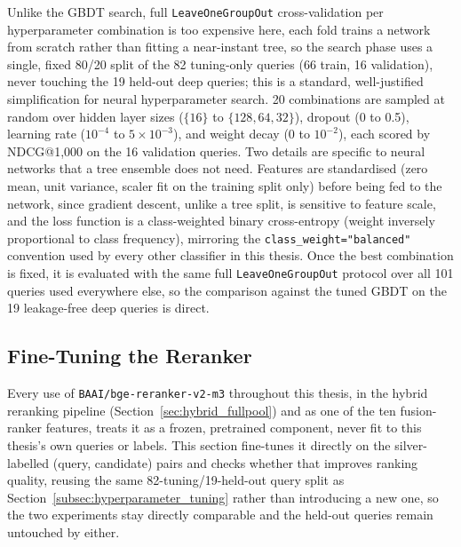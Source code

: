\documentclass[a4paper,oneside,bibliography=totoc]{scrbook}
\begin{document}
Unlike the GBDT search, full \texttt{LeaveOneGroupOut} cross-validation per hyperparameter combination is too expensive here, each fold trains a network from scratch rather than fitting a near-instant tree, so the search phase uses a single, fixed 80/20 split of the 82 tuning-only queries (66 train, 16 validation), never touching the 19 held-out deep queries; this is a standard, well-justified simplification for neural hyperparameter search. 20 combinations are sampled at random over hidden layer sizes ($\{16\}$ to $\{128,64,32\}$), dropout (0 to 0.5), learning rate ($10^{-4}$ to $5\times10^{-3}$), and weight decay (0 to $10^{-2}$), each scored by NDCG@1{,}000 on the 16 validation queries. Two details are specific to neural networks that a tree ensemble does not need. Features are standardised (zero mean, unit variance, scaler fit on the training split only) before being fed to the network, since gradient descent, unlike a tree split, is sensitive to feature scale, and the loss function is a class-weighted binary cross-entropy (weight inversely proportional to class frequency), mirroring the \texttt{class\_weight="balanced"} convention used by every other classifier in this thesis. Once the best combination is fixed, it is evaluated with the same full \texttt{LeaveOneGroupOut} protocol over all 101 queries used everywhere else, so the comparison against the tuned GBDT on the 19 leakage-free deep queries is direct.

\subsection{Fine-Tuning the Reranker}
\label{subsec:reranker_finetuning}

Every use of \texttt{BAAI/bge-reranker-v2-m3} throughout this thesis, in the hybrid reranking pipeline (Section~\ref{sec:hybrid_fullpool}) and as one of the ten fusion-ranker features, treats it as a frozen, pretrained component, never fit to this thesis's own queries or labels. This section fine-tunes it directly on the silver-labelled (query, candidate) pairs and checks whether that improves ranking quality, reusing the same 82-tuning/19-held-out query split as Section~\ref{subsec:hyperparameter_tuning} rather than introducing a new one, so the two experiments stay directly comparable and the held-out queries remain untouched by either.
\end{document}
